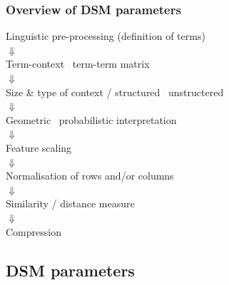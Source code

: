 \begin{frame}
  \frametitle{Overview of DSM parameters}

  \ungap[1]
  \begin{center}
    Linguistic pre-processing (definition of terms)\\
    \pause $\Downarrow$\\
    Term-context \vs\ term-term matrix\\
    \pause $\Downarrow$\\
    Size \& type of context / structured \vs\ unstructered\\
    \pause $\Downarrow$\\
    Geometric \vs\ probabilistic interpretation\\
    \pause $\Downarrow$\\
    Feature scaling\\
    \pause $\Downarrow$\\
    Normalisation of rows and/or columns\\
    \pause $\Downarrow$\\
    Similarity / distance measure\\
    \pause $\Downarrow$\\
    Compression
  \end{center}
\end{frame}

\subsection{DSM parameters}

